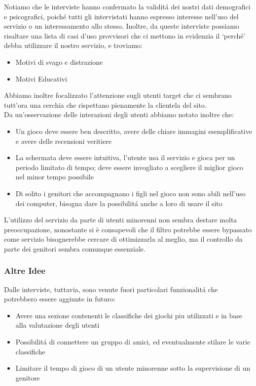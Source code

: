 \documentclass[../Report.tex]{subfiles}
\begin{document}
    Notiamo che le interviste hanno confermato la validitá dei nostri dati demografici e psicografici, poiché tutti gli intervistati hanno espresso interesse nell’uso del servizio o un interessamento allo stesso.
    Inoltre, da queste interviste possiamo risaltare una lista di casi d’uso provvisori che ci mettono in evidenzia il ‘perché’ debba utilizzare il nostro servizio, e troviamo:
    \begin{itemize}
        \item Motivi di svago e distrazione
        \item Motivi Educativi
    \end{itemize}
    Abbiamo inoltre focalizzato l’attenzione sugli utenti target che ci sembrano tutt’ora una cerchia che rispettano pienamente la clientela del sito.\\
    Da un’osservazione delle interazioni degli utenti abbiamo notato inoltre che:
    \begin{itemize}
        \item Un gioco deve essere ben descritto, avere delle chiare immagini esemplificative e avere delle recensioni veritiere
        \item La schermata deve essere intuitiva, l’utente usa il servizio e gioca per un periodo limitato di tempo; deve essere invogliato a scegliere il miglior gioco nel minor tempo possibile
        \item Di solito i genitori che accompagnano i figli nel gioco non sono abili nell’uso dei computer, bisogna dare la possibilitá anche a loro di usare il sito
    \end{itemize}
    L’utilizzo del servizio da parte di utenti minorenni non sembra destare molta preoccupazione, nonostante si è consapevoli che il filtro potrebbe essere bypassato come servizio bisognerebbe cercare di ottimizzarla al meglio, ma il controllo da parte dei genitori sembra comunque essenziale.

    \subsubsection*{Altre Idee}
    Dalle interviste, tuttavia, sono venute fuori particolari funzionalitá che potrebbero essere aggiunte in futuro:
    \begin{itemize}
        \item Avere una sezione contenenti le classifiche dei giochi piu utilizzati e in base alla valutazione degli utenti
        \item Possibilitá di connettere un gruppo di amici, ed eventualmente stilare le varie classifiche
        \item Limitare il tempo di gioco di un utente minorenne sotto la supervisione di un genitore
        
    \end{itemize}
\end{document}
